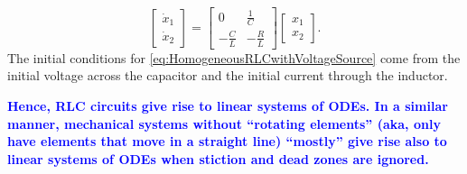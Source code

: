 \begin{equation}
\label{eq:HomogeneousRLCwithVoltageSource}
\left[ \begin{array}{c} \dot{x}_1  \\ \dot{x}_2 \end{array} \right] = \left[ \begin{array}{cc} 0 & \frac{1}{C}\\- \frac{C}{L} & -\frac{R}{L} \end{array}\right] \left[ \begin{array}{c} x_1  \\ x_2 \end{array}\right].
\end{equation}
The initial conditions for \eqref{eq:HomogeneousRLCwithVoltageSource} come from the initial voltage across the capacitor and the initial current through the inductor.
\Qed

\bigskip

\textcolor{blue}{\bf Hence, RLC circuits give rise to linear systems of ODEs. In a similar manner, mechanical systems without ``rotating elements'' (aka, only have elements that move in a straight line) ``mostly'' give rise also to linear systems of ODEs when stiction and dead zones are ignored.}

\bigskip


